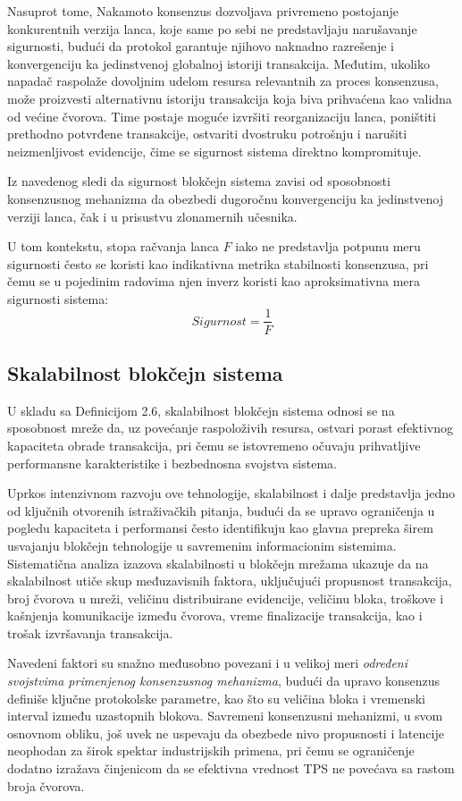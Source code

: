 Nasuprot tome, Nakamoto konsenzus dozvoljava privremeno postojanje konkurentnih verzija lanca, koje same po sebi ne predstavljaju narušavanje sigurnosti, budući da protokol garantuje njihovo naknadno razrešenje i konvergenciju ka jedinstvenoj globalnoj istoriji transakcija. Međutim, ukoliko napadač raspolaže dovoljnim udelom resursa relevantnih za proces konsenzusa, može proizvesti alternativnu istoriju transakcija koja biva prihvaćena kao validna od većine čvorova. Time postaje moguće izvršiti reorganizaciju lanca, poništiti prethodno potvrđene transakcije, ostvariti dvostruku potrošnju i narušiti neizmenljivost evidencije, čime se sigurnost sistema direktno kompromituje.

Iz navedenog sledi da sigurnost blokčejn sistema zavisi od sposobnosti konsenzusnog mehanizma da obezbedi dugoročnu konvergenciju ka jedinstvenoj verziji lanca, čak i u prisustvu zlonamernih učesnika.

U tom kontekstu, stopa račvanja lanca $F$ iako ne predstavlja potpunu meru sigurnosti često se koristi kao indikativna metrika stabilnosti konsenzusa, pri čemu se u pojedinim radovima \cite{nakai2023blockchain} njen inverz koristi kao aproksimativna mera sigurnosti sistema:
$$ Sigurnost = \frac{1}{F} $$

\subsection{Skalabilnost blokčejn sistema}
U skladu sa Definicijom 2.6, skalabilnost blokčejn sistema odnosi se na sposobnost mreže da, uz povećanje raspoloživih resursa, ostvari porast efektivnog kapaciteta obrade transakcija, pri čemu se istovremeno očuvaju prihvatljive performansne karakteristike i bezbednosna svojstva sistema.

Uprkos intenzivnom razvoju ove tehnologije, skalabilnost i dalje predstavlja jedno od ključnih otvorenih istraživačkih pitanja, budući da se upravo ograničenja u pogledu kapaciteta i performansi često identifikuju kao glavna prepreka širem usvajanju blokčejn tehnologije u savremenim informacionim sistemima. Sistematična analiza izazova skalabilnosti u blokčejn mrežama \cite{khan2021systematic} ukazuje da na skalabilnost utiče skup međuzavisnih faktora, uključujući propusnost transakcija, broj čvorova u mreži, veličinu distribuirane evidencije, veličinu bloka, troškove i kašnjenja komunikacije između čvorova, vreme finalizacije transakcija, kao i trošak izvršavanja transakcija.

Navedeni faktori su snažno međusobno povezani i u velikoj meri \textit{određeni svojstvima primenjenog konsenzusnog mehanizma}, budući da upravo konsenzus definiše ključne protokolske parametre, kao što su veličina bloka i vremenski interval između uzastopnih blokova. Savremeni konsenzusni mehanizmi, u svom osnovnom obliku, još uvek ne uspevaju da obezbede nivo propusnosti i latencije neophodan za širok spektar industrijskih primena, pri čemu se ograničenje dodatno izražava činjenicom da se efektivna vrednost TPS ne povećava sa rastom broja čvorova.

